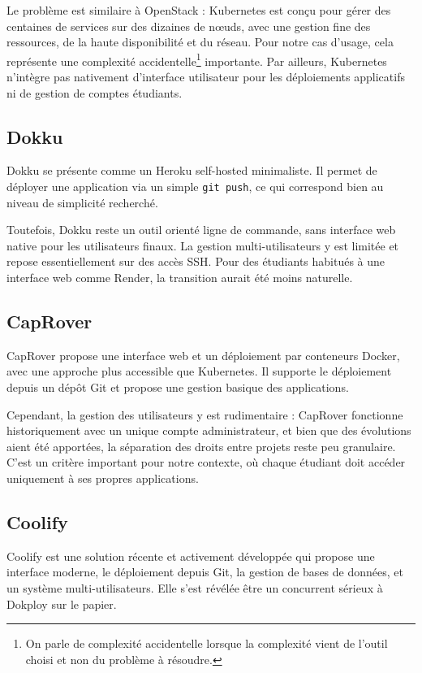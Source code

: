 \documentclass{rapportClass} %
\begin{document}
Le problème est similaire à OpenStack : Kubernetes est conçu pour gérer des centaines de services 
sur des dizaines de nœuds, avec une gestion fine des ressources, de la haute disponibilité et du 
réseau. Pour notre cas d'usage, cela représente une complexité accidentelle\footnote{On parle de 
complexité accidentelle lorsque la complexité vient de l'outil choisi et non du problème à résoudre.} 
importante. Par ailleurs, Kubernetes n'intègre pas nativement d'interface utilisateur pour 
les déploiements applicatifs ni de gestion de comptes étudiants.

\subsection{Dokku}
Dokku se présente comme un Heroku self-hosted minimaliste. Il permet de déployer une application 
via un simple \texttt{git push}, ce qui correspond bien au niveau de simplicité recherché. 

Toutefois, Dokku reste un outil orienté ligne de commande, sans interface web native pour les utilisateurs finaux.
La gestion multi-utilisateurs y est limitée et repose essentiellement sur des accès SSH.
Pour des étudiants habitués à une interface web comme Render, la transition aurait été moins naturelle.

\subsection{CapRover}
CapRover propose une interface web et un déploiement par conteneurs Docker, avec une approche 
plus accessible que Kubernetes. Il supporte le déploiement depuis un dépôt Git et propose une 
gestion basique des applications.

Cependant, la gestion des utilisateurs y est rudimentaire : CapRover fonctionne historiquement 
avec un unique compte administrateur, et bien que des évolutions aient été apportées, 
la séparation des droits entre projets reste peu granulaire. C'est un critère important pour 
notre contexte, où chaque étudiant doit accéder uniquement à ses propres applications.

\subsection{Coolify}
Coolify est une solution récente et activement développée qui propose une interface moderne, 
le déploiement depuis Git, la gestion de bases de données, et un système multi-utilisateurs. 
Elle s'est révélée être un concurrent sérieux à Dokploy sur le papier.
\end{document}
